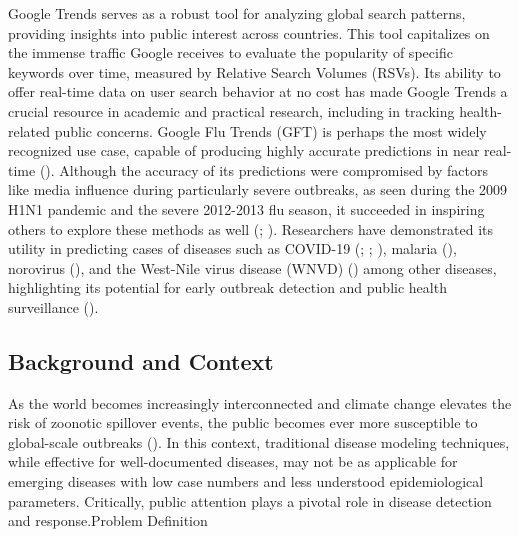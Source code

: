 \documentclass[
  12pt,
]{article}
\begin{document}
Google Trends serves as a robust tool for analyzing global search
patterns, providing insights into public interest across countries. This
tool capitalizes on the immense traffic Google receives to evaluate the
popularity of specific keywords over time, measured by Relative Search
Volumes (RSVs). Its ability to offer real-time data on user search
behavior at no cost has made Google Trends a crucial resource in
academic and practical research, including in tracking health-related
public concerns. Google Flu Trends (GFT) is perhaps the most widely
recognized use case, capable of producing highly accurate predictions in
near real-time ().
Although the accuracy of its predictions were compromised by factors
like media influence during particularly severe outbreaks, as seen
during the 2009 H1N1 pandemic and the severe 2012-2013 flu season, it
succeeded in inspiring others to explore these methods as well
(;
). Researchers have demonstrated
its utility in predicting cases of diseases such as COVID-19
(;
;
), malaria
(),
norovirus (), and the West-Nile
virus disease (WNVD) ()
among other diseases, highlighting its potential for early outbreak
detection and public health surveillance
().

\subsection{Background and Context}\label{background-and-context}

As the world becomes increasingly interconnected and climate change
elevates the risk of zoonotic spillover events, the public becomes ever
more susceptible to global-scale outbreaks
(). In this context,
traditional disease modeling techniques, while effective for
well-documented diseases, may not be as applicable for emerging diseases
with low case numbers and less understood epidemiological parameters.
Critically, public attention plays a pivotal role in disease detection
and response.Problem Definition
\end{document}

